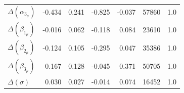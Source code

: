\documentclass[doc,biblatex]{apa7}
\begin{document}
\begin{table}
\begin{center}
\begin{threeparttable}
\begin{tabular}{lrrrrrr}
$\Delta(\alpha_{3_\mu})$     & -0.434 &  0.241 &  -0.825 &   -0.037 &   57860 &    1.0 \\
$\Delta(\beta_{1_\mu})$     & -0.016 &  0.062 &  -0.118 &    0.084 &   23610 &    1.0 \\
$\Delta(\beta_{2_\mu})$     & -0.124 &  0.105 &  -0.295 &    0.047 &   35386 &    1.0 \\
$\Delta(\beta_{3_\mu})$     &  0.167 &  0.128 &  -0.045 &    0.371 &   50705 &    1.0 \\
$\Delta(σ)$      &  0.030 &  0.027 &  -0.014 &    0.074 &   16452 &    1.0 \\
\bottomrule
\end{tabular}
\label{exp2_parameter_estimates}
\end{threeparttable}
\end{center}
\end{table}
\end{document}
